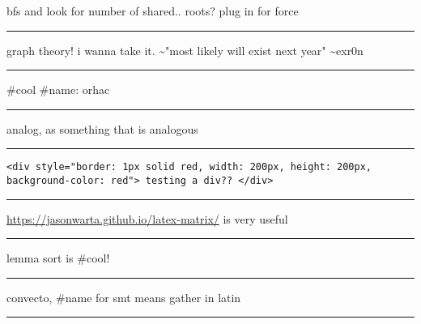 \documentclass[letterpaper]{article}
\begin{document}
bfs and look for number of shared.. roots? plug in for force

\noindent\rule{\textwidth}{0.5pt}

graph theory! i wanna take it. \textasciitilde{}"most likely will exist next year"
\textasciitilde{}exr0n

\noindent\rule{\textwidth}{0.5pt}

\#cool \#name: orhac

\noindent\rule{\textwidth}{0.5pt}

analog, as something that is analogous

\noindent\rule{\textwidth}{0.5pt}

\begin{verbatim}
<div style="border: 1px solid red, width: 200px, height: 200px, background-color: red"> testing a div?? </div>
\end{verbatim}

\noindent\rule{\textwidth}{0.5pt}

\url{https://jasonwarta.github.io/latex-matrix/} is very useful

\noindent\rule{\textwidth}{0.5pt}

lemma sort is \#cool!

\noindent\rule{\textwidth}{0.5pt}

convecto, \#name for smt means gather in latin

\noindent\rule{\textwidth}{0.5pt}
\end{document}
